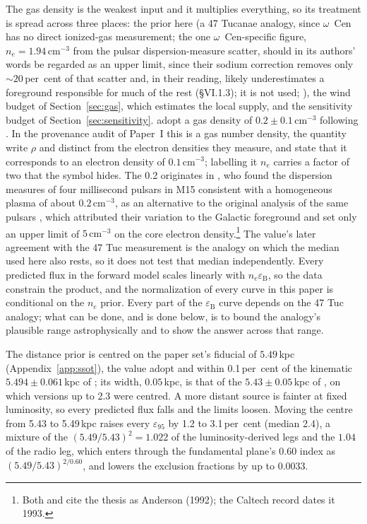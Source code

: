 \documentclass[11pt]{article}
\newcommand{\ocen}{$\omega$~Cen}
\newcommand{\eps}{\ensuremath{\varepsilon_{\mathrm{B}}}}
\newcommand{\epsl}{\ensuremath{\varepsilon_{95}}}
\begin{document}
The gas density is the weakest input and it multiplies everything, so its treatment is spread across three places: the prior here (a 47 Tucanae analogy, since \ocen{} has no direct ionized-gas measurement; the one \ocen-specific figure, $n_{e} = 1.94\,\mathrm{cm^{-3}}$ from the pulsar dispersion-measure scatter, should in its authors' words be regarded as an upper limit, since their sodium correction removes only ${\sim}20$\,per~cent of that scatter and, in their reading, likely underestimates a foreground responsible for much of the rest (\S VI.1.3); it is not used; \citealt{oMEGACatVII2025}), the wind budget of Section~\ref{sec:gas}, which estimates the local supply, and the sensitivity budget of Section~\ref{sec:sensitivity}. \citet{Mahida2026} adopt a gas density of $0.2 \pm 0.1\,\mathrm{cm^{-3}}$ following \citet{Strader2012}. In the provenance audit of Paper~I this is a gas number density, the quantity \citeauthor{Strader2012} write $\rho$ and distinct from the electron densities they measure, and \citet{Tremou2018} state that it corresponds to an electron density of $0.1\,\mathrm{cm^{-3}}$; labelling it $n_{e}$ carries a factor of two that the symbol hides. The 0.2 originates in \citet{Freire2001}, who found the dispersion measures of four millisecond pulsars in M15 consistent with a homogeneous plasma of about $0.2\,\mathrm{cm^{-3}}$, as an alternative to the original analysis of the same pulsars \citep{AndersonSB1993}, which attributed their variation to the Galactic foreground and set only an upper limit of $5\,\mathrm{cm^{-3}}$ on the core electron density.\footnote{Both \citet{Freire2001} and \citet{Mahida2026} cite the thesis as Anderson (1992); the Caltech record dates it 1993.} The value's later agreement with the 47 Tuc measurement \citep{Abbate2018} is the analogy on which the median used here also rests, so it does not test that median independently. Every predicted flux in the forward model scales linearly with $n_{e}\eps$, so the data constrain the product, and the normalization of every curve in this paper is conditional on the $n_{e}$ prior. Every part of the $\eps$ curve depends on the 47 Tuc analogy; what can be done, and is done below, is to bound the analogy's plausible range astrophysically and to show the answer across that range.

The distance prior is centred on the paper set's fiducial of $5.49$\,kpc (Appendix~\ref{app:ssot}), the value \citet{Chen2025JWST} adopt and within 0.1\,per~cent of the kinematic $5.494 \pm 0.061$\,kpc of \citet{Mahida2026}; its width, $0.05$\,kpc, is that of the $5.43 \pm 0.05$\,kpc of \citet{BaumgardtVasiliev2021}, on which versions up to 2.3 were centred. A more distant source is fainter at fixed luminosity, so every predicted flux falls and the limits loosen. Moving the centre from 5.43 to 5.49\,kpc raises every \epsl{} by 1.2 to 3.1\,per~cent (median 2.4), a mixture of the $(5.49/5.43)^{2} = 1.022$ of the luminosity-derived legs and the $1.04$ of the radio leg, which enters through the fundamental plane's $0.60$ index as $(5.49/5.43)^{2/0.60}$, and lowers the exclusion fractions by up to 0.0033.
\end{document}
